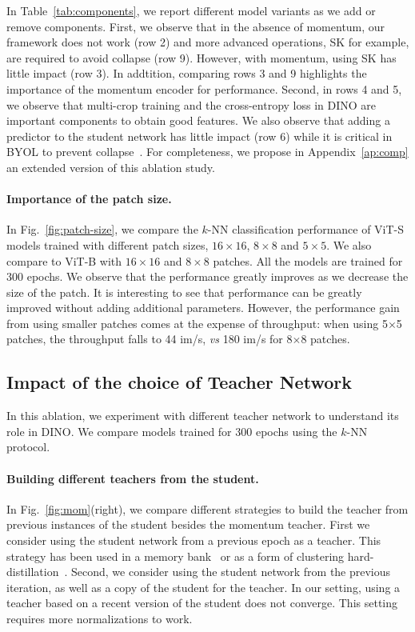 In Table~\ref{tab:components}, we report different model variants as we add or remove components. First, we observe that in the absence of momentum, our framework does not work (row \textcolor{darkF7E0D5}{2}) and more advanced operations, SK for example, are required to avoid collapse (row \textcolor{darkF7E0D5}{9}).
However, with momentum, using SK has little impact (row \textcolor{darkF7E0D5}{3}).
In addtition, comparing rows \textcolor{darkF7E0D5}{3} and \textcolor{darkF7E0D5}{9} highlights the importance of the momentum encoder for performance. Second, in rows \textcolor{darkF7E0D5}{4} and \textcolor{darkF7E0D5}{5}, we observe that multi-crop training and the cross-entropy loss in DINO are important components to obtain good features. We also observe that adding a predictor to the student network has little impact (row \textcolor{darkF7E0D5}{6}) while it is critical in BYOL to prevent collapse~\cite{chen2020exploring,grill2020bootstrap}. For completeness, we propose in Appendix~\ref{ap:comp} an extended version of this ablation study.

\paragraph{Importance of the patch size.} In Fig.~\ref{fig:patch-size}, we compare the $k$-NN classification performance of ViT-S models trained with different patch sizes, $16\times 16$, $8\times 8$ and $5\times 5$. We also compare to ViT-B with $16 \times 16$ and $8\times 8$ patches. All the models are trained for 300 epochs. We observe that the performance greatly improves as we decrease the size of the patch. It is interesting to see that performance can be greatly improved without adding additional parameters. However, the performance gain from using smaller patches comes at the expense of throughput: when using 5$\times$5 patches, the throughput falls to 44 im/s, \emph{vs} 180 im/s for 8$\times$8 patches.

\subsection{Impact of the choice of Teacher Network}
\label{sec:teacher}
In this ablation, we experiment with different teacher network to understand its role in DINO. We compare models trained for $300$ epochs using the $k$-NN protocol.

\paragraph{Building different teachers from the student.} In Fig.~\ref{fig:mom}(right), we compare different strategies to build the teacher from previous instances of the student besides the momentum teacher. First we consider using the student network from a previous epoch as a teacher. This strategy has been used in a memory bank~\cite{wu2018unsupervised} or as a form of clustering hard-distillation~\cite{caron2018deep,asano2019self,chen2020unsupervised}. Second, we consider using the student network from the previous iteration, as well as a copy of the student for the teacher. In our setting, using a teacher based on a recent version of the student does not converge. This setting requires more normalizations to work.

